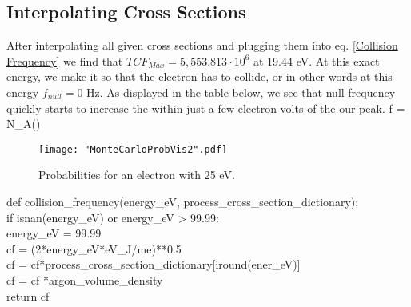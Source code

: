 \documentclass[12pt]{article}
\begin{document}
\subsection{Interpolating Cross Sections}
After interpolating all given cross sections and plugging them into eq. \ref{Collision 
	Frequency} we find that $TCF_{Max}  =  5,553.813\cdot10^6$ at 19.44 eV. At this exact 
energy, we make it so that the electron has to collide, or in other words at this energy 
$f_{null} = 0 $ Hz. As displayed in the table below, we see that null frequency quickly starts to increase the within just a few electron volts of the our peak. 
\beqn
f = N_{A}\sigma(\epsilon)  
\label{Collision Frequency}
\eeqn





\begin{figure}[H]
	\centering
	\texttt{[image: "MonteCarloProbVis2".pdf]}
	\caption{Probabilities for an electron with 25 eV.}
	\label{Weighted Probability}
\end{figure}



{\selectfont def collision\_frequency(energy\_eV, process\_cross\_section\_dictionary):\\
	\hspace*{3ex}if isnan(energy\_eV) or energy\_eV > 99.99:\\
	\hspace*{6ex}energy\_eV = 99.99\\
	\hspace*{3ex}cf = (2*energy\_eV*eV\_J/me)**0.5\\
	\hspace*{3ex}cf = cf*process\_cross\_section\_dictionary[iround(ener\_eV)]\\
	\hspace*{3ex}cf = cf *argon\_volume\_density\\
	\hspace*{3ex}return cf\\
}
\end{document}
